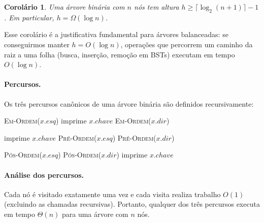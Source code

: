 \documentclass[9pt,a4paper]{extarticle}
\newcommand{\impt}[1]{\textcolor{important}{#1}}
\newcommand{\ntc}[1]{\textcolor{notice}{#1}}
\newtheorem{corollary}[theorem]{Corolário}
\theoremstyle{definition}
\begin{document}
\begin{corollary}
Uma árvore binária com $n$ nós tem altura $h \geq \lceil \log_2(n+1) \rceil - 1$. Em particular, \impt{$h = \Omega(\log n)$}.
\end{corollary}

Esse corolário é a justificativa fundamental para árvores \ntc{balanceadas}: se conseguirmos manter $h = O(\log n)$, operações que percorrem um caminho da raiz a uma folha (busca, inserção, remoção em BSTs) executam em tempo $O(\log n)$.

\paragraph{Percursos.} Os três percursos canônicos de uma árvore binária são definidos recursivamente:

\begin{algorithm}[H]
\caption{\textsc{Em-Ordem}($x$) -- visita: esquerda, raiz, direita}
\begin{algorithmic}[1]
    \State \textsc{Em-Ordem}($x.\mathit{esq}$)
    \State imprime $x.\mathit{chave}$
    \State \textsc{Em-Ordem}($x.\mathit{dir}$)
\EndIf
\end{algorithmic}
\end{algorithm}

\begin{algorithm}[H]
\caption{\textsc{Pré-Ordem}($x$) -- visita: raiz, esquerda, direita}
\begin{algorithmic}[1]
    \State imprime $x.\mathit{chave}$
    \State \textsc{Pré-Ordem}($x.\mathit{esq}$)
    \State \textsc{Pré-Ordem}($x.\mathit{dir}$)
\EndIf
\end{algorithmic}
\end{algorithm}

\begin{algorithm}[H]
\caption{\textsc{Pós-Ordem}($x$) -- visita: esquerda, direita, raiz}
\begin{algorithmic}[1]
    \State \textsc{Pós-Ordem}($x.\mathit{esq}$)
    \State \textsc{Pós-Ordem}($x.\mathit{dir}$)
    \State imprime $x.\mathit{chave}$
\EndIf
\end{algorithmic}
\end{algorithm}

\paragraph{Análise dos percursos.} Cada nó é visitado exatamente uma vez e cada visita realiza trabalho $O(1)$ (excluindo as chamadas recursivas). Portanto, qualquer dos três percursos executa em \impt{tempo $\Theta(n)$} para uma árvore com $n$ nós.
\end{document}
